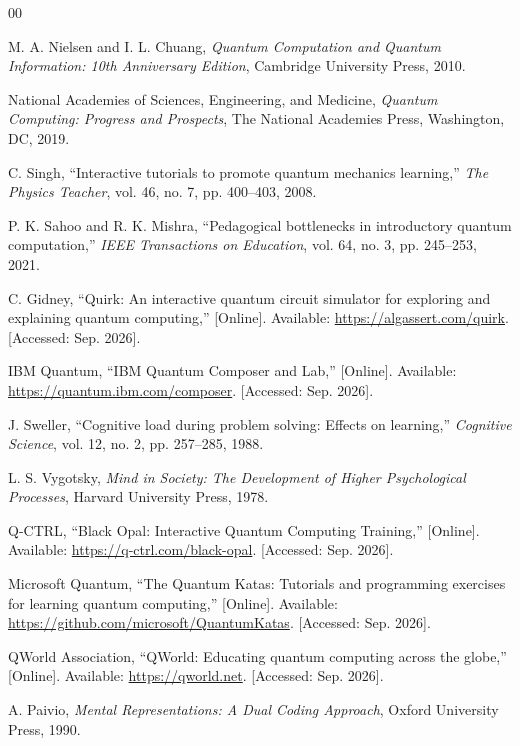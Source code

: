 \documentclass[conference]{IEEEtran}
\begin{document}
\begin{thebibliography}{00}
\footnotesize
\setlength{\itemsep}{0.2pt plus 0.2pt}
\setlength{\parskip}{0pt}

 M. A. Nielsen and I. L. Chuang, \emph{Quantum Computation and Quantum Information: 10th Anniversary Edition}, Cambridge University Press, 2010.

 National Academies of Sciences, Engineering, and Medicine, \emph{Quantum Computing: Progress and Prospects}, The National Academies Press, Washington, DC, 2019.

 C. Singh, ``Interactive tutorials to promote quantum mechanics learning,'' \emph{The Physics Teacher}, vol. 46, no. 7, pp. 400--403, 2008.

 P. K. Sahoo and R. K. Mishra, ``Pedagogical bottlenecks in introductory quantum computation,'' \emph{IEEE Transactions on Education}, vol. 64, no. 3, pp. 245--253, 2021.

 C. Gidney, ``Quirk: An interactive quantum circuit simulator for exploring and explaining quantum computing,'' [Online]. Available: \url{https://algassert.com/quirk}. [Accessed: Sep. 2026].

 IBM Quantum, ``IBM Quantum Composer and Lab,'' [Online]. Available: \url{https://quantum.ibm.com/composer}. [Accessed: Sep. 2026].

 J. Sweller, ``Cognitive load during problem solving: Effects on learning,'' \emph{Cognitive Science}, vol. 12, no. 2, pp. 257--285, 1988.

 L. S. Vygotsky, \emph{Mind in Society: The Development of Higher Psychological Processes}, Harvard University Press, 1978.

 Q-CTRL, ``Black Opal: Interactive Quantum Computing Training,'' [Online]. Available: \url{https://q-ctrl.com/black-opal}. [Accessed: Sep. 2026].

 Microsoft Quantum, ``The Quantum Katas: Tutorials and programming exercises for learning quantum computing,'' [Online]. Available: \url{https://github.com/microsoft/QuantumKatas}. [Accessed: Sep. 2026].

 QWorld Association, ``QWorld: Educating quantum computing across the globe,'' [Online]. Available: \url{https://qworld.net}. [Accessed: Sep. 2026].

 A. Paivio, \emph{Mental Representations: A Dual Coding Approach}, Oxford University Press, 1990.


\end{thebibliography}
\end{document}
